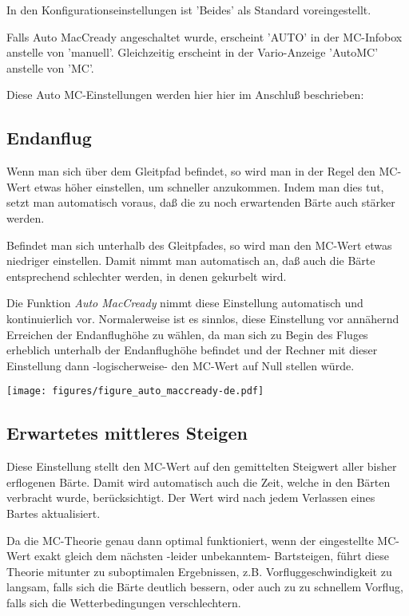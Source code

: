 In den Konfigurationseinstellungen ist  'Beides' als Standard voreingestellt.

Falls Auto MacCready angeschaltet wurde, erscheint 'AUTO'  in der MC-Infobox
anstelle von 'manuell'. Gleichzeitig erscheint in der Vario-Anzeige 'AutoMC' anstelle von 'MC'.

Diese Auto MC-Einstellungen werden hier hier im Anschluß beschrieben:

\subsection*{Endanflug}
Wenn man sich über dem Gleitpfad befindet, so wird man in der Regel den MC-Wert etwas höher einstellen,
um schneller anzukommen. Indem man dies tut, setzt man automatisch voraus, daß die zu noch erwartenden
Bärte auch stärker werden.

Befindet man sich unterhalb des Gleitpfades, so wird man den MC-Wert etwas niedriger einstellen.
Damit nimmt man automatisch an, daß auch die Bärte entsprechend schlechter werden, in denen gekurbelt wird.

Die Funktion \textsl{Auto MacCready} nimmt diese Einstellung automatisch und kontinuierlich vor.
Normalerweise ist es sinnlos, diese Einstellung vor annähernd Erreichen der Endanflughöhe  zu wählen, da man sich
zu Begin des Fluges erheblich unterhalb der Endanflughöhe befindet und der Rechner mit dieser Einstellung dann
-logischerweise- den MC-Wert auf Null stellen würde.


\begin{maxipage}
\begin{center}
\texttt{[image: figures/figure\_auto\_maccready-de.pdf]}
\end{center}
\end{maxipage}

\subsection*{Erwartetes mittleres Steigen}

Diese Einstellung stellt den MC-Wert auf den gemittelten Steigwert aller bisher erflogenen Bärte.
Damit wird automatisch auch die Zeit, welche in den Bärten verbracht wurde, berücksichtigt.
Der Wert wird nach jedem Verlassen eines Bartes aktualisiert.

Da die MC-Theorie genau dann optimal funktioniert, wenn der eingestellte MC-Wert exakt gleich dem
nächsten -leider unbekanntem- Bartsteigen, führt diese Theorie mitunter zu suboptimalen Ergebnissen,
z.B. Vorfluggeschwindigkeit zu langsam, falls sich die Bärte deutlich bessern, oder auch zu zu schnellem Vorflug,
falls sich die Wetterbedingungen verschlechtern.

